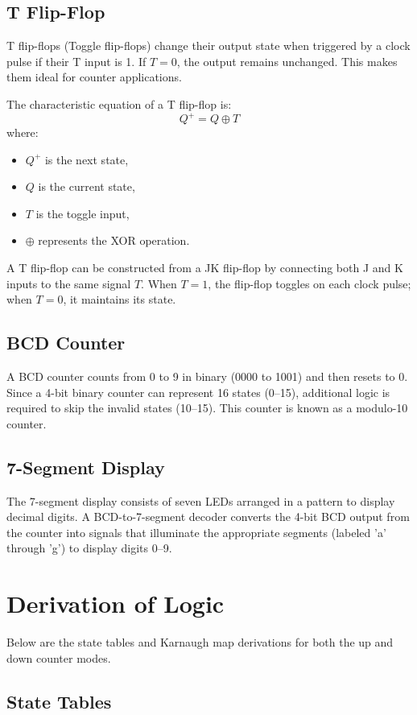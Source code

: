 \documentclass[12pt]{article}
\begin{document}
\subsection*{T Flip-Flop}
T flip-flops (Toggle flip-flops) change their output state when triggered by a clock pulse if their T input is 1. If \(T=0\), the output remains unchanged. This makes them ideal for counter applications.

The characteristic equation of a T flip-flop is:
\[
Q^+ = Q \oplus T
\]
where:
\begin{itemize}
    \item \(Q^+\) is the next state,
    \item \(Q\) is the current state,
    \item \(T\) is the toggle input,
    \item \(\oplus\) represents the XOR operation.
\end{itemize}

A T flip-flop can be constructed from a JK flip-flop by connecting both J and K inputs to the same signal \(T\). When \(T=1\), the flip-flop toggles on each clock pulse; when \(T=0\), it maintains its state.

\subsection*{BCD Counter}
A BCD counter counts from 0 to 9 in binary (0000 to 1001) and then resets to 0. Since a 4-bit binary counter can represent 16 states (0--15), additional logic is required to skip the invalid states (10--15). This counter is known as a modulo-10 counter.

\subsection*{7-Segment Display}
The 7-segment display consists of seven LEDs arranged in a pattern to display decimal digits. A BCD-to-7-segment decoder converts the 4-bit BCD output from the counter into signals that illuminate the appropriate segments (labeled 'a' through 'g') to display digits 0--9.

\section*{Derivation of Logic}

Below are the state tables and Karnaugh map derivations for both the up and down counter modes.

\subsection*{State Tables}
\end{document}
